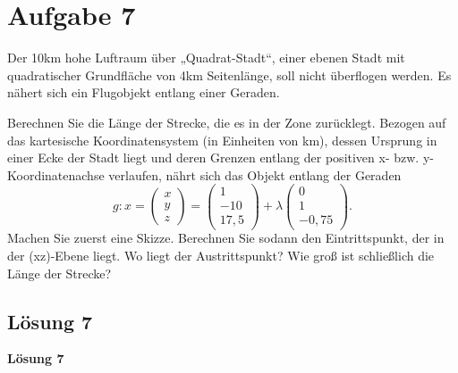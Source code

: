 \section{Aufgabe 7}

Der 10km hohe Luftraum über „Quadrat-Stadt“, einer ebenen Stadt mit quadratischer Grundfläche von 4km Seitenlänge, soll nicht überflogen werden. Es nähert sich ein Flugobjekt entlang einer Geraden. 

Berechnen Sie die Länge der Strecke, die es in der Zone zurücklegt. Bezogen auf das kartesische Koordinatensystem (in Einheiten von km), dessen Ursprung in einer Ecke der Stadt liegt und deren Grenzen entlang der positiven x- bzw. y-Koordinatenachse verlaufen, nährt sich das Objekt entlang der Geraden
\begin{equation*}
	g:x=\begin{pmatrix}
		x\\
		y\\
		z
	\end{pmatrix} =\begin{pmatrix}
		1\\
		-10\\
		17,5
	\end{pmatrix} +\lambda \begin{pmatrix}
		0\\
		1\\
		-0,75
	\end{pmatrix}\text{.}
\end{equation*}
Machen Sie zuerst eine Skizze. Berechnen Sie sodann den Eintrittspunkt, der in der (xz)-Ebene liegt. Wo liegt der Austrittspunkt? Wie groß ist schließlich die Länge der Strecke?

\subsection{Lösung 7}

\textbf{Lösung 7}



